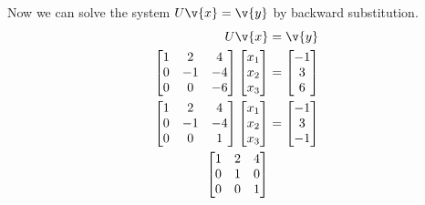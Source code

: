 \documentclass[11pt]{article}
\begin{document}
\begin{enumerate}
\begin{enumerate}
                Now we can solve the system $U\v{x} = \v{y}$ by backward
                substitution.
                \begin{align*}
                    U\v{x} &= \v{y} \\
                    \begin{bmatrix}
                        1 & 2 & 4 \\
                        0 & -1 & -4 \\
                        0 & 0 & -6
                    \end{bmatrix}
                    \begin{bmatrix}
                        x_1 \\
                        x_2 \\
                        x_3
                    \end{bmatrix}
                    &=
                    \begin{bmatrix}
                        -1 \\
                        3 \\
                        6
                    \end{bmatrix} \\
                    \begin{bmatrix}
                        1 & 2 & 4 \\
                        0 & -1 & -4 \\
                        0 & 0 & 1
                    \end{bmatrix}
                    \begin{bmatrix}
                        x_1 \\
                        x_2 \\
                        x_3
                    \end{bmatrix}
                    &=
                    \begin{bmatrix}
                        -1 \\
                        3 \\
                        -1
                    \end{bmatrix} \\
                    \begin{bmatrix}
                        1 & 2 & 4 \\
                        0 & 1 & 0 \\
                        0 & 0 & 1

\end{bmatrix}
\end{align*}
\end{enumerate}
\end{enumerate}
\end{document}
